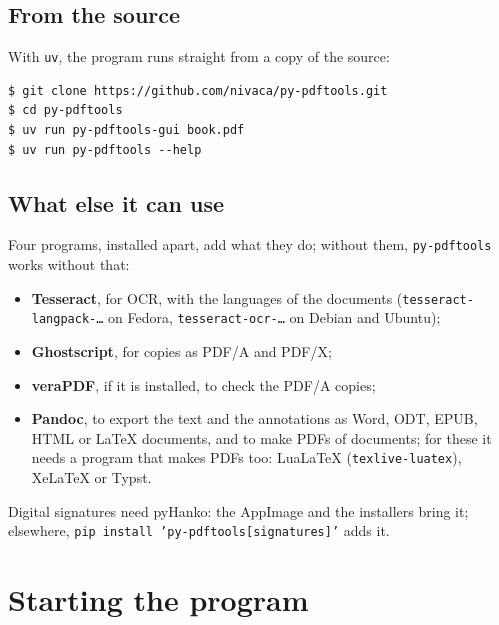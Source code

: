 \documentclass[12pt,
              article,
              oneside
              ]{memoir}
\begin{document}
\subsection{From the source}

%
With \texttt{uv}, the program runs straight from a copy of the source:

\begin{verbatim}
$ git clone https://github.com/nivaca/py-pdftools.git
$ cd py-pdftools
$ uv run py-pdftools-gui book.pdf
$ uv run py-pdftools --help
\end{verbatim}

\subsection{What else it can use}

Four programs, installed apart, add what they do; without them,
\texttt{py-pdftools} works without that:

%
\begin{itemize}
\item \textbf{Tesseract}, for OCR, with the languages of the documents
  (\texttt{tesseract-langpack-\ldots} on Fedora, \texttt{tesseract-ocr-\ldots}
  on Debian and Ubuntu);
\item \textbf{Ghostscript}, for copies as PDF/A and PDF/X;
\item \textbf{veraPDF}, if it is installed, to check the PDF/A copies;
\item \textbf{Pandoc}, to export the text and the annotations as Word,
  ODT, EPUB, HTML or LaTeX documents, and to make PDFs of documents; for
  these it needs a program that makes PDFs too: LuaLaTeX
  (\texttt{texlive-luatex}), XeLaTeX or Typst.
\end{itemize}

\noindent{}%
Digital signatures need pyHanko: the AppImage and the installers
bring it; elsewhere, \texttt{pip install 'py-pdftools[signatures]'} adds it.

\section{Starting the program}
\end{document}
